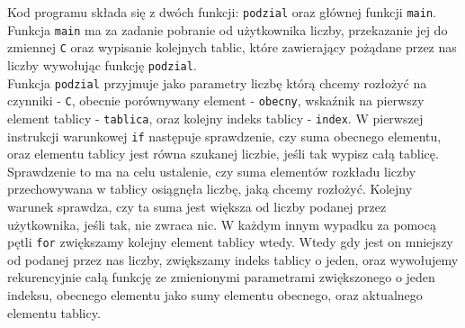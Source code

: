 \documentclass[UTF8]{article}
\begin{document}
Kod programu składa się z dwóch funkcji: \texttt{podzial} oraz głównej funkcji \texttt{main}. ~\\

Funkcja \texttt{main} ma za zadanie pobranie od użytkownika liczby, przekazanie jej do zmiennej \texttt{C} oraz wypisanie kolejnych tablic, które zawierający pożądane przez nas liczby wywołując funkcję \texttt{podzial}. ~\\

Funkcja \texttt{podzial} przyjmuje jako parametry liczbę którą chcemy rozłożyć na czynniki - \texttt{C}, obecnie porównywany element - \texttt{obecny}, wskaźnik na pierwszy element tablicy - \texttt{tablica}, oraz kolejny indeks tablicy - \texttt{index}. W pierwszej instrukcji warunkowej \texttt{if} następuje sprawdzenie, czy suma obecnego elementu, oraz elementu tablicy jest równa szukanej liczbie, jeśli tak wypisz całą tablicę. Sprawdzenie to ma na celu ustalenie, czy suma elementów rozkładu liczby przechowywana w tablicy osiągnęła liczbę, jaką chcemy rozłożyć. Kolejny warunek sprawdza, czy ta suma jest większa od liczby podanej przez użytkownika, jeśli tak, nie zwraca nic. W każdym innym wypadku za pomocą pętli \texttt{for} zwiększamy kolejny element tablicy wtedy. Wtedy gdy jest on mniejszy od podanej przez nas liczby, zwiększamy indeks tablicy o jeden, oraz wywołujemy rekurencyjnie całą funkcję ze zmienionymi parametrami zwiększonego o jeden indeksu, obecnego elementu jako sumy elementu obecnego, oraz aktualnego elementu tablicy.~
\end{document}
